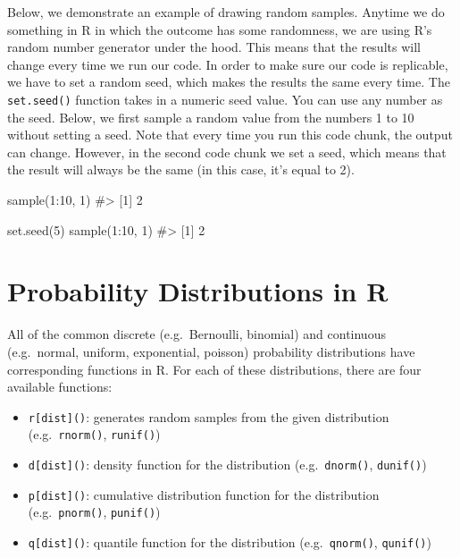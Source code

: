 \documentclass[
  letterpaper,
]{krantz}
\makeatletter
\newenvironment{Shaded}{\begin{snugshade}}{\end{snugshade}}
\newcommand{\CommentTok}[1]{\textcolor[rgb]{0.37,0.37,0.37}{#1}}
\newcommand{\DecValTok}[1]{\textcolor[rgb]{0.68,0.00,0.00}{#1}}
\newcommand{\FunctionTok}[1]{\textcolor[rgb]{0.28,0.35,0.67}{#1}}
\newcommand{\NormalTok}[1]{\textcolor[rgb]{0.00,0.23,0.31}{#1}}
\newcommand{\SpecialCharTok}[1]{\textcolor[rgb]{0.37,0.37,0.37}{#1}}
\providecommand{\tightlist}{%
  \setlength{\itemsep}{0pt}\setlength{\parskip}{0pt}}\usepackage{longtable,booktabs,array}
\newenvironment{kframe}{%
\medskip{}
\setlength{\fboxsep}{.8em}
 \def\at@end@of@kframe{}%
 \ifinner\ifhmode%
  \def\at@end@of@kframe{\end{minipage}}%
  \begin{minipage}{\columnwidth}%
 \fi\fi%
 \def\FrameCommand##1{\hskip\@totalleftmargin \hskip-\fboxsep
 \colorbox{shadecolor}{##1}\hskip-\fboxsep
     \hskip-\linewidth \hskip-\@totalleftmargin \hskip\columnwidth}%
 \MakeFramed {\advance\hsize-\width
   \@totalleftmargin\z@ \linewidth\hsize
   \@setminipage}}%
 {\par\unskip\endMakeFramed%
 \at@end@of@kframe}
\renewenvironment{Shaded}{\begin{kframe}}{\end{kframe}}
\makeatother
\begin{document}
Below, we demonstrate an example of drawing random samples. Anytime we
do something in R in which the outcome has some randomness, we are using
R's random number generator under the hood. This means that the results
will change every time we run our code. In order to make sure our code
is replicable, we have to set a random seed, which makes the results the
same every time. The \texttt{set.seed()} function takes in a numeric
seed value. You can use any number as the seed. Below, we first sample a
random value from the numbers 1 to 10 without setting a seed. Note that
every time you run this code chunk, the output can change. However, in
the second code chunk we set a seed, which means that the result will
always be the same (in this case, it's equal to 2).

\begin{Shaded}
\begin{Highlighting}[]
\FunctionTok{sample}\NormalTok{(}\DecValTok{1}\SpecialCharTok{:}\DecValTok{10}\NormalTok{, }\DecValTok{1}\NormalTok{)}
\CommentTok{\#\textgreater{} [1] 2}
\end{Highlighting}
\end{Shaded}

\begin{Shaded}
\begin{Highlighting}[]
\FunctionTok{set.seed}\NormalTok{(}\DecValTok{5}\NormalTok{)}
\FunctionTok{sample}\NormalTok{(}\DecValTok{1}\SpecialCharTok{:}\DecValTok{10}\NormalTok{, }\DecValTok{1}\NormalTok{)}
\CommentTok{\#\textgreater{} [1] 2}
\end{Highlighting}
\end{Shaded}

\hypertarget{probability-distributions-in-r}{%
\section{Probability Distributions in
R}\label{probability-distributions-in-r}}

All of the common discrete (e.g.~Bernoulli, binomial) and continuous
(e.g.~normal, uniform, exponential, poisson) probability distributions
have corresponding functions in R. For each of these distributions,
there are four available functions:

\begin{itemize}
\tightlist
\item
  \texttt{r{[}dist{]}()}: generates random samples from the given
  distribution (e.g.~\texttt{rnorm()}, \texttt{runif()})\\
\item
  \texttt{d{[}dist{]}()}: density function for the distribution
  (e.g.~\texttt{dnorm()}, \texttt{dunif()})\\
\item
  \texttt{p{[}dist{]}()}: cumulative distribution function for the
  distribution (e.g.~\texttt{pnorm()}, \texttt{punif()})\\
\item
  \texttt{q{[}dist{]}()}: quantile function for the distribution
  (e.g.~\texttt{qnorm()}, \texttt{qunif()})
\end{itemize}
\end{document}
